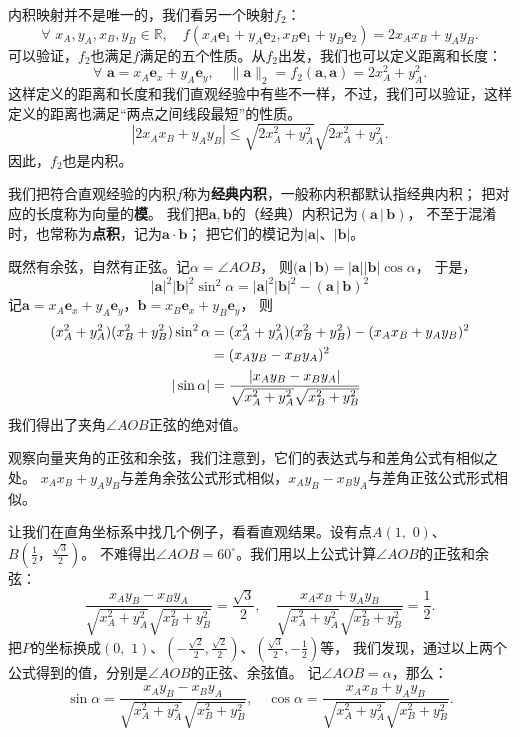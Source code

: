 \documentclass[12pt,UTF8]{ctexbook}
\begin{document}
内积映射并不是唯一的，我们看另一个映射$f_2$：
$$ \forall \,\, x_A, y_A, x_B, y_B \in \mathbb{R}, \quad f(x_A\mathbf{e}_1 + y_A\mathbf{e}_2, x_B\mathbf{e}_1 + y_B\mathbf{e}_2) = 2x_Ax_B + y_A y_B.$$
可以验证，$f_2$也满足$f$满足的五个性质。从$f_2$出发，我们也可以定义距离和长度：
$$ \forall \,\, \mathbf{a} = x_A\mathbf{e}_x + y_A\mathbf{e}_y, \quad \| \mathbf{a} \|_2 = f_2(\mathbf{a}, \mathbf{a}) = 2x_A^2 + y_A^2. $$
这样定义的距离和长度和我们直观经验中有些不一样，不过，我们可以验证，这样定义的距离也满足“两点之间线段最短”的性质。
$$ |2x_Ax_B + y_Ay_B| \leqslant \sqrt{2x_A^2 + y_A^2} \sqrt{2x_A^2 + y_A^2}.$$
因此，$f_2$也是内积。

我们把符合直观经验的内积$f$称为\textbf{经典内积}，一般称内积都默认指经典内积；
把对应的长度称为向量的\textbf{模}。
我们把$\mathbf{a}, \mathbf{b}$的（经典）内积记为$(\mathbf{a}\, | \, \mathbf{b})$，
不至于混淆时，也常称为\textbf{点积}，记为$\mathbf{a} \cdot \mathbf{b}$；
把它们的模记为$|\mathbf{a}|$、$|\mathbf{b}|$。

既然有余弦，自然有正弦。记$\alpha = \angle AOB$，
则$(\mathbf{a}\, | \, \mathbf{b}) = |\mathbf{a}||\mathbf{b}| \cos \alpha$，
于是，
$$ |\mathbf{a}|^2|\mathbf{b}|^2 \sin^2 \alpha = |\mathbf{a}|^2|\mathbf{b}|^2 - (\mathbf{a}\, | \, \mathbf{b})^2 $$
记$\mathbf{a} = x_A\mathbf{e}_x + y_A\mathbf{e}_y$，$\mathbf{b} = x_B\mathbf{e}_x + y_B\mathbf{e}_y$，
则
\begin{align}
    (x_A^2 + y_A^2)(x_B^2 + y_B^2) \sin^2 \alpha &= (x_A^2 + y_A^2)(x_B^2 + y_B^2) - (x_Ax_B + y_Ay_B)^2 \notag \\
    &= (x_Ay_B - x_By_A)^2 \notag \\
    |\sin \alpha| &= \frac{|x_Ay_B - x_By_A|}{\sqrt{x_A^2 + y_A^2} \sqrt{x_B^2 + y_B^2}} \notag
\end{align}
我们得出了夹角$\angle AOB$正弦的绝对值。

观察向量夹角的正弦和余弦，我们注意到，它们的表达式与和差角公式有相似之处。
$x_Ax_B + y_Ay_B$与差角余弦公式形式相似，$x_Ay_B - x_By_A$与差角正弦公式形式相似。

让我们在直角坐标系中找几个例子，看看直观结果。设有点$A(1,\,\,0)$、$B(\frac{1}{2}，\frac{\sqrt{3}}{2})$。
不难得出$\angle AOB = 60^\circ$。我们用以上公式计算$\angle AOB$的正弦和余弦：
$$ \frac{x_Ay_B - x_By_A}{\sqrt{x_A^2 + y_A^2}\sqrt{x_B^2 + y_B^2}} = \frac{\sqrt{3}}{2}, \quad \frac{x_Ax_B + y_Ay_B}{\sqrt{x_A^2 + y_A^2} \sqrt{x_B^2 + y_B^2}} = \frac{1}{2}. $$
把$P$的坐标换成$(0,\,\,1)$、$(-\frac{\sqrt{2}}{2}, \frac{\sqrt{2}}{2})$、$(\frac{\sqrt{3}}{2},-\frac{1}{2})$等，
我们发现，通过以上两个公式得到的值，分别是$\angle AOB$的正弦、余弦值。
记$\angle AOB = \alpha$，那么：
$$ \sin \alpha = \frac{x_Ay_B - x_By_A}{\sqrt{x_A^2 + y_A^2}\sqrt{x_B^2 + y_B^2}}, \quad \cos \alpha = \frac{x_Ax_B + y_Ay_B}{\sqrt{x_A^2 + y_A^2} \sqrt{x_B^2 + y_B^2}}. $$
\end{document}
